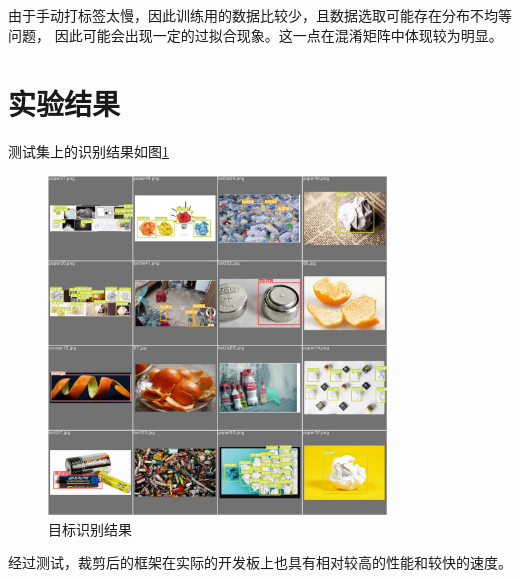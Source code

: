\documentclass{article}
\begin{document}
由于手动打标签太慢，因此训练用的数据比较少，且数据选取可能存在分布不均等问题，
因此可能会出现一定的过拟合现象。这一点在混淆矩阵中体现较为明显。


\section{实验结果}

测试集上的识别结果如图\ref{dect}

\begin{figure}[H]
    \centering
    \includegraphics[width=0.8\textwidth]{figures/test_batch0_labels.jpg}
    \caption{目标识别结果}
    \label{dect}
\end{figure}

经过测试，裁剪后的框架在实际的开发板上也具有相对较高的性能和较快的速度。
\end{document}
